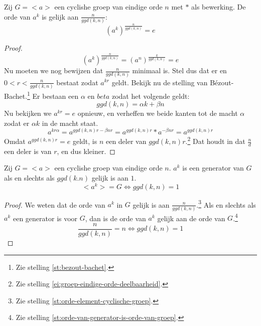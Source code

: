 \documentclass[main.tex]{subfiles}
\begin{document}
\begin{st}
  \label{st:orde-element-cyclische-groep}
  Zij $G = <a>$ een cyclishe groep van eindige orde $n$ met $*$ als bewerking.
  De orde van $a^{k}$ is gelijk aan $\frac{n}{ggd(k,n)}$:
  \[ (a^{k})^{\frac{n}{ggd(k,n)}} = e\]
  
  \begin{proof}
    \[ (a^{k})^{\frac{n}{ggd(k,n)}} = (a^{n})^{\frac{k}{ggd(k,n)}} = e \]
    Nu moeten we nog bewijzen dat $\frac{n}{ggd(k,n)}$ minimaal is.
    Stel dus dat er en $0 < r < \frac{n}{ggd(k,n)}$ bestaat zodat $a^{kr}$ geldt.
    Bekijk nu de stelling van B\'ezout-Bachet.\footnote{Zie stelling \ref{st:bezout-bachet}.}
    Er bestaan een $\alpha$ en $beta$ zodat het volgende geldt:
    \[ ggd(k,n) = \alpha k + \beta n \]
    Nu bekijken we $a^{kr} = e$ opnieuw, en verheffen we beide kanten tot de macht $\alpha$ zodat er $\alpha k$ in de macht staat.
    \[ a^{kr\alpha} = a^{ggd(k,n)r - \beta nr} = a^{ggd(k,n)r}* a^{-\beta nr} = a^{ggd(k,n)r}\]
    Omdat $a^{ggd(k,n)r} = e$ geldt, is $n$ een deler van $ggd(k,n)r$.\footnote{Zie stelling \ref{ei:groep-eindige-orde-deelbaarheid}.}
    Dat houdt in dat $\frac{n}{d}$ een deler is van $r$, en dus kleiner.
  \end{proof}

\end{st}

\begin{st}
  Zij $G = <a>$ een cyclishe groep van eindige orde $n$.
  $a^{k}$ is een generator van $G$ als en slechts als $ggd(k.n)$ gelijk is aan $1$.
  \[ <a^{k}> = G \Leftrightarrow ggd(k,n) = 1 \]

  \begin{proof}
     We weten dat de orde van $a^{k}$ in $G$ gelijk is aan $\frac{n}{ggd(k,n)}$.\footnote{Zie stelling \ref{st:orde-element-cyclische-groep}.}
     Als en slechts als $a^{k}$ een generator is voor $G$, dan is de orde van $a^{k}$ gelijk aan de orde van $G$.\footnote{Zie stelling \ref{st:orde-van-generator-is-orde-van-groep}.}
     \[ \frac{n}{ggd(k,n)} = n \Leftrightarrow ggd(k,n) = 1 \]
  \end{proof}
\end{st}
\end{document}
